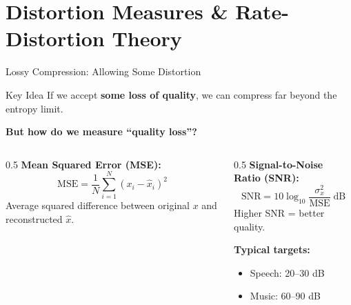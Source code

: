 \documentclass[aspectratio=169,12pt]{beamer}
\begin{document}
\section{Distortion Measures \& Rate-Distortion Theory}

\begin{frame}{Lossy Compression: Allowing Some Distortion}
    \begin{alertblock}{Key Idea}
        If we accept \textbf{some loss of quality}, we can compress far beyond the entropy limit.
    \end{alertblock}
    
    \vspace{0.3cm}
    \textbf{But how do we measure ``quality loss''?}
    
    \vspace{0.3cm}
    \begin{columns}
        \begin{column}{0.5\textwidth}
            \textbf{Mean Squared Error (MSE):}
            \[
                \text{MSE} = \frac{1}{N}\sum_{i=1}^{N}(x_i - \hat{x}_i)^2
            \]
            Average squared difference between original $x$ and reconstructed $\hat{x}$.
        \end{column}
        \begin{column}{0.5\textwidth}
            \textbf{Signal-to-Noise Ratio (SNR):}
            \[
                \text{SNR} = 10 \log_{10}\frac{\sigma_x^2}{\text{MSE}} \;\text{dB}
            \]
            Higher SNR = better quality.
            
            \vspace{0.2cm}
            \textbf{Typical targets:}
            \begin{itemize}
                \item Speech: 20--30 dB
                \item Music: 60--90 dB
            \end{itemize}
        \end{column}
    \end{columns}
\end{frame}
\end{document}
